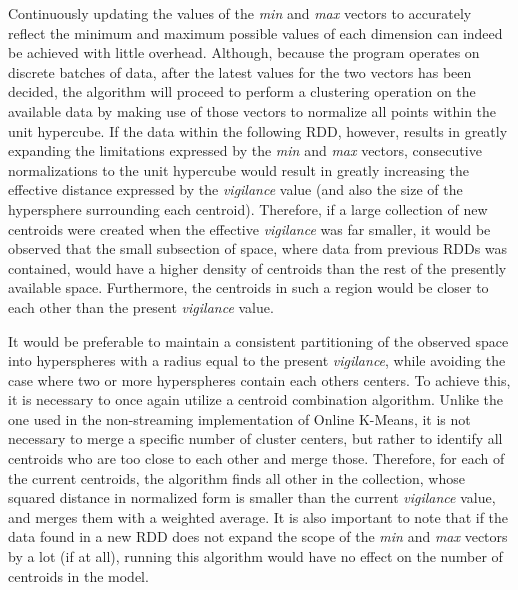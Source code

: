 \documentclass{l4proj}
\begin{document}
Continuously updating the values of the \textit{min} and \textit{max} vectors to accurately reflect the minimum and maximum possible values of each dimension can indeed be achieved with little overhead. Although, because the program operates on discrete batches of data, after the latest values for the two vectors has been decided, the algorithm will proceed to perform a clustering operation on the available data by making use of those vectors to normalize all points within the unit hypercube. If the data within the following RDD, however, results in greatly expanding the limitations expressed by the \textit{min} and \textit{max} vectors, consecutive normalizations to the unit hypercube would result in greatly increasing the effective distance expressed by the \textit{vigilance} value (and also the size of the hypersphere surrounding each centroid). Therefore, if a large collection of new centroids were created when the effective \textit{vigilance} was far smaller, it would be observed that the small subsection of space, where data from previous RDDs was contained, would have a higher density of centroids than the rest of the presently available space. Furthermore, the centroids in such a region would be closer to each other than the present \textit{vigilance} value.

It would be preferable to maintain a consistent partitioning of the observed space into hyperspheres with a radius equal to the present \textit{vigilance}, while avoiding the case where two or more hyperspheres contain each others centers. To achieve this, it is necessary to once again utilize a centroid combination algorithm. Unlike the one used in the non-streaming implementation of Online K-Means, it is not necessary to merge a specific number of cluster centers, but rather to identify all centroids who are too close to each other and merge those. Therefore, for each of the current centroids, the algorithm finds all other in the collection, whose squared distance in normalized form is smaller than the current \textit{vigilance} value, and merges them with a weighted average. It is also important to note that if the data found in a new RDD does not expand the scope of the \textit{min} and \textit{max} vectors by a lot (if at all), running this algorithm would have no effect on the number of centroids in the model.
\end{document}

